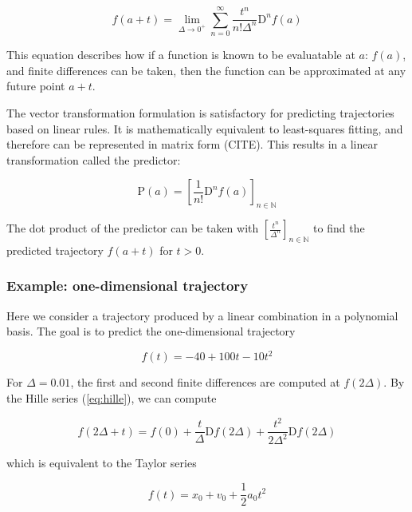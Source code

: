 \documentclass{article}
\begin{document}
\begin{equation}
  \label{eq:hille}
  f(a + t) = \lim_{\Delta \rightarrow 0^+} \sum_{n=0}^{\infty} \frac{t^n}{n! \Delta^n} \mathrm{D}^n f(a)
\end{equation}

This equation describes how if a function is known to be evaluatable at $a$: $f(a)$,
and finite differences can be taken,
then the function can be approximated at any future point $a + t$.

The vector transformation formulation is satisfactory for predicting trajectories
based on linear rules.
It is mathematically equivalent to least-squares fitting, and therefore can be represented in matrix form (CITE).
This results in a linear transformation called the predictor:

\begin{equation}
  \mathrm{P}(a) = \left[ \frac{1}{n!} \mathrm{D}^n f(a) \right]_{n \in \mathbb{N}}
\end{equation}

The dot product of the predictor can be taken with $\left[ \frac{t^n}{\Delta^n} \right]_{n \in \mathbb{N}}$
to find the predicted trajectory $f(a + t)$ for $t > 0$.

\subsubsection{Example: one-dimensional trajectory}

Here we consider a trajectory produced by a linear combination in a polynomial basis.
The goal is to predict the one-dimensional trajectory

\begin{equation}
  f(t) = -40 + 100 t - 10 t^2
\end{equation}

For $\Delta = 0.01$, the first and second finite differences
are computed at $f(2\Delta)$.
By the Hille series (\ref{eq:hille}), we can compute

\begin{equation}
	f(2\Delta + t) = f(0) + \frac{t}{\Delta} \mathrm{D}f(2\Delta) + \frac{t^2}{2 \Delta^2} \mathrm{D}f(2\Delta)
\end{equation}

which is equivalent to the Taylor series

\begin{equation}
  f(t) = x_0 + v_0 + \frac{1}{2} a_0 t^2
\end{equation}
\end{document}

